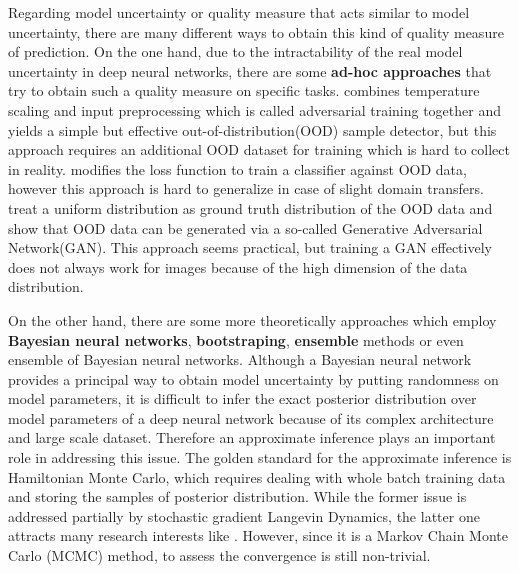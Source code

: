 Regarding model uncertainty or quality measure that acts similar to model uncertainty, there are many different ways to obtain this kind of quality measure of prediction. On the one hand, due to the intractability of the real model uncertainty in deep neural networks, there are some \textbf{ad-hoc approaches} that try to obtain such a quality measure on specific tasks.
\cite{liang2017enhancing} combines temperature scaling and input preprocessing which is called adversarial training together and yields a simple but effective out-of-distribution(OOD)  sample detector, but this approach requires an additional OOD dataset for training which is hard to collect in reality. \cite{devries2018learning} modifies the loss function to train a classifier against OOD data, however this approach is hard to generalize in case of slight domain transfers. \cite{lee2017training} treat a uniform distribution as ground truth distribution of the OOD data and show that OOD data can be generated via a so-called Generative Adversarial Network(GAN). This approach seems practical, but training a GAN effectively does not always work for images because of the high dimension of the data distribution. 

On the other hand, there are some more theoretically approaches which employ \textbf{Bayesian neural networks}\cite{mackay1992practical}\cite{neal2012bayesian}, \textbf{bootstraping}\cite{osband2016deep}, \textbf{ensemble} methods\cite{lakshminarayanan2017simple} or even ensemble of Bayesian neural networks\cite{smith2018understanding}. Although a Bayesian neural network provides a principal way to obtain model uncertainty by putting randomness on model parameters, it is difficult to infer the exact posterior distribution over model parameters of a deep neural network because of its complex architecture and large scale dataset. Therefore an approximate inference plays an important role in addressing this issue. The golden standard for the approximate inference is Hamiltonian Monte Carlo\cite{neal2012bayesian}, which requires dealing with whole batch training data and storing the samples of posterior distribution. While the former issue is addressed partially by stochastic gradient Langevin Dynamics\cite{welling2011bayesian}, the latter one attracts many research interests like \cite{balan2015bayesian}\cite{wang2018adversarial}. However, since it is a Markov Chain Monte Carlo (MCMC) method, to assess the convergence is still non-trivial.
 
